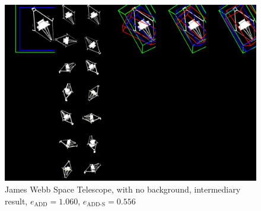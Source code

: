\begin{figure}[ht]
  \centering
  \includegraphics[width=\textwidth]{data/fig16.jpg}
  \caption{James Webb Space Telescope, with no background, intermediary result, $e_\mathrm{ADD}=1.060$, $e_{\mathrm{ADD}\text{-}\mathrm{S}}=0.556$}
  \label{fig:fig16}
\end{figure}

